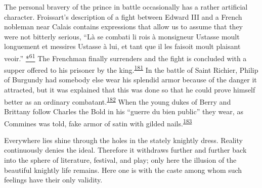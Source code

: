 \protect\hypertarget{10_Chapter_Three__THE_HEROIC_DREAM.xhtmlux5cux23page_115}{}{}The
personal bravery of the prince in battle occasionally has a rather
artificial character. Froissart's description of a fight between Edward
III and a French nobleman near Calais contains expressions that allow us
to assume that they were not bitterly serious, ``Là se combati li rois à
monsigneur Ustasse moult longuement et messires Ustasse à lui, et tant
que il les faisoit moult plaisant veoir.''
\protect\hypertarget{10_Chapter_Three__THE_HEROIC_DREAM.xhtmlux5cux23id_2909}{\protect\hyperlink{23_NOTES.xhtmlux5cux23id_2910}{*\textsuperscript{61}}}
The Frenchman finally surrenders and the fight is concluded with a
supper offered to his prisoner by the
king.\textsuperscript{\protect\hypertarget{10_Chapter_Three__THE_HEROIC_DREAM.xhtmlux5cux23id_1574}{\protect\hyperlink{23_NOTES.xhtmlux5cux23id_1575}{181}}}
In the battle of Saint Richier, Philip of Burgundy had somebody else
wear his splendid armor because of the danger it attracted, but it was
explained that this was done so that he could prove himself better as an
ordinary
combatant.\textsuperscript{\protect\hypertarget{10_Chapter_Three__THE_HEROIC_DREAM.xhtmlux5cux23id_1572}{\protect\hyperlink{23_NOTES.xhtmlux5cux23id_1573}{182}}}
When the young dukes of Berry and Brittany follow Charles the Bold in
his ``guerre du bien public'' they wear, as Commines was told, fake
armor of satin with gilded
nails.\textsuperscript{\protect\hypertarget{10_Chapter_Three__THE_HEROIC_DREAM.xhtmlux5cux23id_1570}{\protect\hyperlink{23_NOTES.xhtmlux5cux23id_1571}{183}}}

Everywhere lies shine through the holes in the stately knightly dress.
Reality continuously denies the ideal. Therefore it withdraws further
and further back into the sphere of literature, festival, and play; only
here the illusion of the beautiful knightly life remains. Here one is
with the caste among whom such feelings have their only validity.

